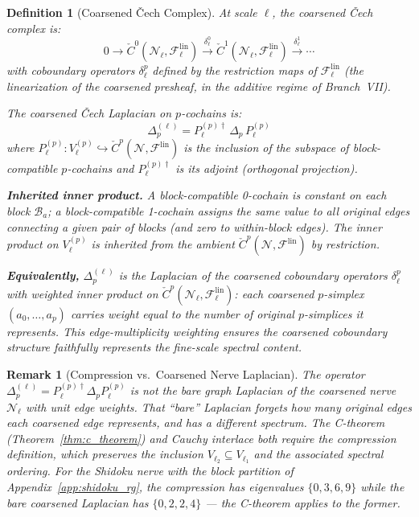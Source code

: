 \documentclass[11pt,letterpaper]{article}
\newtheorem{definition}[conjecture]{Definition}
\newtheorem{remark}[conjecture]{Remark}
\newcommand{\Cech}{\check{C}}
\newcommand{\sheaf}{\mathcal{F}}
\newcommand{\nerve}{\mathcal{N}}
\newcommand{\block}{\mathcal{B}}
\begin{document}
\begin{definition}[Coarsened \v{C}ech 
Complex]\label{def:coarsened_cech}
At scale $\ell$, the \emph{coarsened \v{C}ech complex} is:
\begin{equation}\label{eq:coarsened_complex}
    0 \longrightarrow \Cech^0(\nerve_\ell, \sheaf_\ell^{\mathrm{lin}}) 
    \xrightarrow{\;\delta_\ell^0\;}
    \Cech^1(\nerve_\ell, \sheaf_\ell^{\mathrm{lin}}) 
    \xrightarrow{\;\delta_\ell^1\;} \cdots
\end{equation}
with coboundary operators $\delta_\ell^p$ defined by the restriction 
maps of $\sheaf_\ell^{\mathrm{lin}}$ (the linearization of the 
coarsened presheaf, in the additive regime of Branch~VII).

The \emph{coarsened \v{C}ech Laplacian} on $p$-cochains is:
\begin{equation}\label{eq:coarsened_laplacian}
    \Delta_p^{(\ell)} = P_\ell^{(p)\dagger} \, \Delta_p \, P_\ell^{(p)}
\end{equation}
where $P_\ell^{(p)} : V_\ell^{(p)} \hookrightarrow 
\Cech^p(\nerve, \sheaf^{\mathrm{lin}})$ is the inclusion of the 
subspace of \emph{block-compatible $p$-cochains} and 
$P_\ell^{(p)\dagger}$ is its adjoint (orthogonal projection).

\textbf{Inherited inner product.} A block-compatible 0-cochain is 
constant on each block $\block_a$; a block-compatible 1-cochain 
assigns the same value to all original edges connecting a given 
pair of blocks (and zero to within-block edges). The inner product 
on $V_\ell^{(p)}$ is inherited from the ambient 
$\Cech^p(\nerve, \sheaf^{\mathrm{lin}})$ by restriction.

\textbf{Equivalently,} $\Delta_p^{(\ell)}$ is the Laplacian of the 
coarsened coboundary operators $\delta_\ell^p$ with \emph{weighted} 
inner product on $\Cech^p(\nerve_\ell, \sheaf_\ell^{\mathrm{lin}})$: 
each coarsened $p$-simplex $(a_0, \ldots, a_p)$ carries weight 
equal to the number of original $p$-simplices it represents. This 
edge-multiplicity weighting ensures the coarsened coboundary 
structure faithfully represents the fine-scale spectral content.
\end{definition}

\begin{remark}[Compression vs.\ Coarsened Nerve 
Laplacian]\label{rem:compression_vs_coarse}
The operator $\Delta_p^{(\ell)} = P_\ell^{(p)\dagger} \Delta_p 
P_\ell^{(p)}$ is \emph{not} the bare graph Laplacian of the 
coarsened nerve $\nerve_\ell$ with unit edge weights. That ``bare'' 
Laplacian forgets how many original edges each coarsened edge 
represents, and has a different spectrum. The C-theorem 
(Theorem~\ref{thm:c_theorem}) and Cauchy interlace both require the 
\emph{compression} definition, which preserves the inclusion 
$V_{\ell_2} \subseteq V_{\ell_1}$ and the associated spectral 
ordering. For the Shidoku nerve with the block partition of 
Appendix~\ref{app:shidoku_rg}, the compression has eigenvalues 
$\{0, 3, 6, 9\}$ while the bare coarsened Laplacian has 
$\{0, 2, 2, 4\}$ --- the C-theorem applies to the former.
\end{remark}
\end{document}
